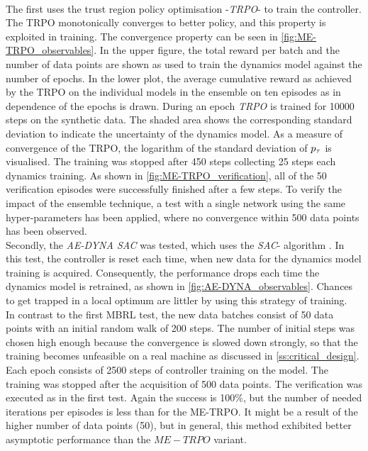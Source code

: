 \documentclass[
reprint,
amsmath,amssymb,amsfonts,clevref,
aps,
prstab,
]{revtex4-2}
\begin{document}
	\\ The first uses the trust region policy optimisation -\emph{TRPO}- \cite{Schulman2015} to train the controller. The TRPO monotonically converges to better policy, and this property is exploited in training. The convergence property can be seen in \cref{fig:ME-TRPO_observables}. In the upper figure, the total reward per batch and the number of data points are shown as used to train the dynamics model against the number of epochs. In the lower plot, the average cumulative reward as achieved by the TRPO on the individual models in the ensemble on ten episodes as in dependence of the epochs is drawn. During an epoch \emph{TRPO} is trained for 10000 steps on the synthetic data. The shaded area shows the corresponding standard deviation to indicate the uncertainty of the dynamics model. As a measure of convergence of the TRPO, the logarithm of the standard deviation of $p_\tau$ is visualised. The training was stopped after 450 steps collecting 25 steps each dynamics training. As shown in \cref{fig:ME-TRPO_verification}, all of the 50 verification episodes were successfully finished after a few steps. To verify the impact of the ensemble technique, a test with a single network using the same hyper-parameters has been applied, where no convergence within 500 data points has been observed. \\
	Secondly, the \emph{AE-DYNA SAC} was tested, which uses the \emph{SAC}- algorithm \cite{Haarnoja2018a}. In this test, the controller is reset each time, when new data for the dynamics model training is acquired. Consequently, the performance drops each time the dynamics model is retrained, as shown in \cref{fig:AE-DYNA_observables}. Chances to get trapped in a local optimum are littler by using this strategy of training.\\
	In contrast to the first MBRL test, the new data batches consist of 50 data points with an initial random walk of 200 steps. The number of initial steps was chosen high enough because the convergence is slowed down strongly, so that the training becomes unfeasible on a real machine as discussed in \cref{ss:critical_design}. Each epoch consists of 2500 steps of controller training on the model. The training was stopped after the acquisition of 500 data points. The verification was executed as in the first test. Again the success is 100\%, but the number of needed iterations per episodes is less than for the ME-TRPO. It might be a result of the higher number of data points (50), but in general, this method exhibited better asymptotic performance than the $ME-TRPO$ variant.
\end{document}
